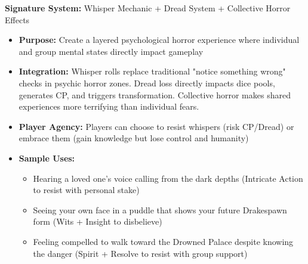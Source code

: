 \documentclass[11pt]{article}
\begin{document}
\textbf{Signature System:} Whisper Mechanic + Dread System + Collective Horror Effects
\begin{itemize}
\item \textbf{Purpose:} Create a layered psychological horror experience where individual and group mental states directly impact gameplay
\item \textbf{Integration:} Whisper rolls replace traditional "notice something wrong" checks in psychic horror zones. Dread loss directly impacts dice pools, generates CP, and triggers transformation. Collective horror makes shared experiences more terrifying than individual fears.
\item \textbf{Player Agency:} Players can choose to resist whispers (risk CP/Dread) or embrace them (gain knowledge but lose control and humanity)
\item \textbf{Sample Uses:}
  \begin{itemize}
  \item Hearing a loved one's voice calling from the dark depths (Intricate Action to resist with personal stake)
  \item Seeing your own face in a puddle that shows your future Drakespawn form (Wits + Insight to disbelieve)
  \item Feeling compelled to walk toward the Drowned Palace despite knowing the danger (Spirit + Resolve to resist with group support)
  \end{itemize}
\end{itemize}
\end{document}
